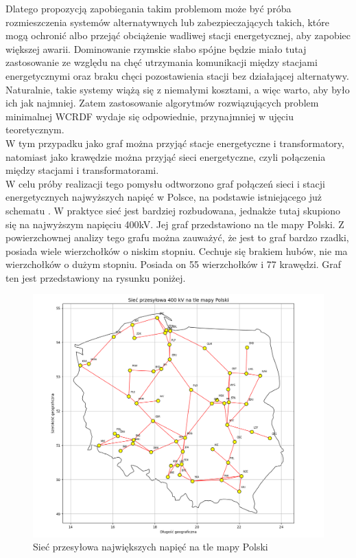 Dlatego propozycją zapobiegania takim problemom może być próba rozmieszczenia systemów alternatywnych lub zabezpieczających takich, które mogą ochronić albo przejąć obciążenie wadliwej stacji energetycznej, aby zapobiec większej awarii. Dominowanie rzymskie słabo spójne będzie miało tutaj zastosowanie ze względu na chęć utrzymania komunikacji między stacjami energetycznymi oraz braku chęci pozostawienia stacji bez działającej alternatywy. Naturalnie, takie systemy wiążą się z niemałymi kosztami, a więc warto, aby było ich jak najmniej. Zatem zastosowanie algorytmów rozwiązujących problem minimalnej WCRDF wydaje się odpowiednie, przynajmniej w ujęciu teoretycznym.\\
W tym przypadku jako graf można przyjąć stacje energetyczne i transformatory, natomiast jako krawędzie można przyjąć sieci energetyczne, czyli połączenia między stacjami i transformatorami.\\
W celu próby realizacji tego pomysłu odtworzono graf połączeń sieci i stacji energetycznych najwyższych napięć w Polsce, na podstawie istniejącego już schematu \cite{POLAND}. W praktyce sieć jest bardziej rozbudowana, jednakże tutaj skupiono się na najwyższym napięciu 400kV. Jej graf przedstawiono na tle mapy Polski. Z powierzchownej analizy tego grafu można zauważyć, że jest to graf bardzo rzadki, posiada wiele wierzchołków o niskim stopniu. Cechuje się brakiem hubów, nie ma wierzchołków o dużym stopniu. Posiada on 55 wierzchołków i 77 krawędzi. Graf ten jest przedstawiony na rysunku poniżej.

\begin{figure}[H]
    \centering
    \includegraphics[width=\textwidth]{assets/Poland/image.png}
    \caption{Sieć przesyłowa największych napięć na tle mapy Polski}
    \label{fig:poland}
\end{figure}

